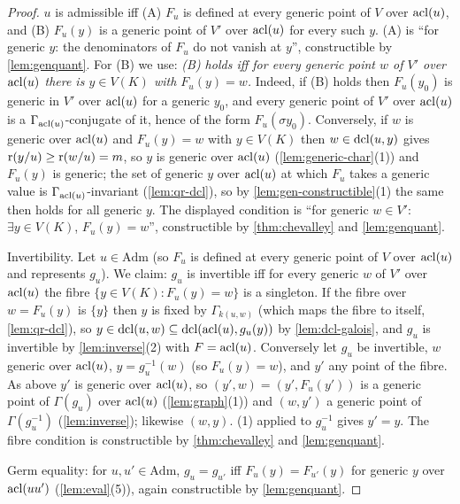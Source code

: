 \begin{proof}
$u$ is admissible iff (A) $F_u$ is defined at every generic point of $V$ over $\operatorname{acl}(u)$,
and (B) $F_u(y)$ is a generic point of $V'$ over $\operatorname{acl}(u)$ for every such $y$.
(A) is ``for generic $y$: the denominators of $F_u$ do not vanish at $y$'', constructible
by \cref{lem:genquant}.  For (B) we use: \emph{(B) holds iff for every generic point $w$
of $V'$ over $\operatorname{acl}(u)$ there is $y\in V(K)$ with $F_u(y)=w$.}  Indeed, if (B) holds then
$F_u(y_0)$ is generic in $V'$ over $\operatorname{acl}(u)$ for a generic $y_0$, and every generic point
of $V'$ over $\operatorname{acl}(u)$ is a $\Gamma_{\operatorname{acl}(u)}$-conjugate of it, hence of the form
$F_u(\sigma y_0)$.  Conversely, if $w$ is generic over $\operatorname{acl}(u)$ and $F_u(y)=w$ with
$y\in V(K)$ then $w\in\operatorname{dcl}(u,y)$ gives $\operatorname{r}(y/u)\ge\operatorname{r}(w/u)=m$, so $y$ is generic over
$\operatorname{acl}(u)$ (\cref{lem:generic-char}(1)) and $F_u(y)$ is generic; the set of generic $y$
over $\operatorname{acl}(u)$ at which $F_u$ takes a generic value is $\Gamma_{\operatorname{acl}(u)}$-invariant
(\cref{lem:qr-dcl}), so by \cref{lem:gen-constructible}(1) the same then holds for all
generic $y$.  The displayed condition is ``for generic $w\in V'$: $\exists y\in V(K)$,
$F_u(y)=w$'', constructible by \cref{thm:chevalley} and \cref{lem:genquant}.

Invertibility.  Let $u\in\mathrm{Adm}$ (so $F_u$ is defined at every generic point of $V$
over $\operatorname{acl}(u)$ and represents $g_u$).  We claim: $g_u$ is invertible iff for every
generic $w$ of $V'$ over $\operatorname{acl}(u)$ the fibre $\{y\in V(K):F_u(y)=w\}$ is a singleton.
If the fibre over $w=F_u(y)$ is $\{y\}$ then $y$ is fixed by $\Gamma_{k(u,w)}$ (which
maps the fibre to itself, \cref{lem:qr-dcl}), so $y\in\operatorname{dcl}(u,w)\subseteq\operatorname{dcl}(\operatorname{acl}(u),g_u(y))$
by \cref{lem:dcl-galois}, and $g_u$ is invertible by \cref{lem:inverse}(2) with
$F=\operatorname{acl}(u)$.  Conversely let $g_u$ be invertible, $w$ generic over $\operatorname{acl}(u)$,
$y=g_u^{-1}(w)$ (so $F_u(y)=w$), and $y'$ any point of the fibre.  As above $y'$ is
generic over $\operatorname{acl}(u)$, so $(y',w)=(y',F_u(y'))$ is a generic point of $\Gamma(g_u)$ over
$\operatorname{acl}(u)$ (\cref{lem:graph}(1)) and $(w,y')$ a generic point of $\Gamma(g_u^{-1})$
(\cref{lem:inverse}); likewise $(w,y)$.  (1) applied to $g_u^{-1}$ gives
$y'=y$.  The fibre condition is constructible by \cref{thm:chevalley} and \cref{lem:genquant}.

Germ equality: for $u,u'\in\mathrm{Adm}$, $g_u=g_{u'}$ iff $F_u(y)=F_{u'}(y)$ for generic
$y$ over $\operatorname{acl}(uu')$ (\cref{lem:eval}(5)), again constructible by \cref{lem:genquant}.


\end{proof}
